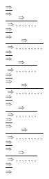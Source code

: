 \documentclass[11pt]{article}
\begin{document}
\begin{center}
\bigskip
\\$\frac{\Rightarrow }{\Rightarrow }$
\bigskip
\\$\frac{\Rightarrow }{\Rightarrow , , , , , , , }$
\bigskip
\\$\frac{\Rightarrow }{\Rightarrow }$
\bigskip
\\$\frac{\Rightarrow }{\Rightarrow , , , , , , , , , }$
\bigskip
\\$\frac{\Rightarrow }{\Rightarrow }$
\bigskip
\\$\frac{\Rightarrow }{\Rightarrow , , , , , , , }$
\bigskip
\\$\frac{\Rightarrow }{\Rightarrow }$
\bigskip
\\$\frac{\Rightarrow }{\Rightarrow , , , , , , , , , }$
\bigskip
\\$\frac{\Rightarrow }{\Rightarrow }$
\bigskip
\\$\frac{\Rightarrow }{\Rightarrow , , , , , , , }$
\bigskip
\\$\frac{\Rightarrow }{\Rightarrow }$
\bigskip
\\$\frac{\Rightarrow }{\Rightarrow , , , , , , , , , }$
\bigskip
\\$\frac{\Rightarrow }{\Rightarrow }$
\bigskip
\\$\frac{\Rightarrow }{\Rightarrow , , , , , , , }$
\bigskip
\\$\frac{\Rightarrow }{\Rightarrow }$
\bigskip
\\
\end{center}
\end{document}
